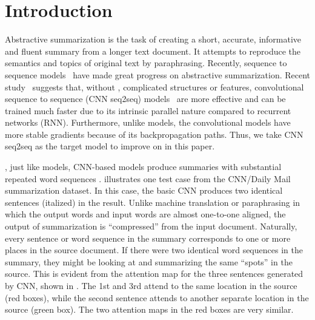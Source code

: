 \section{Introduction}
\label{sec:intro}

Abstractive summarization is the task of creating a short, accurate,
informative and fluent summary from a longer text document.
It attempts to reproduce the semantics and topics of original text
by paraphrasing. 
Recently, sequence to sequence
models~\cite{RushCW15,ChopraAR16,NallapatiZSGX16,SeeLM17,PaulusXS17}
have made great progress on abstractive summarization.
Recent study~\cite{bai2018empirical} suggests that, 
without \DIFdelbegin {}\DIFdelend \DIFaddbegin {}\DIFaddend , complicated structures or features,
convolutional sequence to sequence 
(CNN seq2seq) models~\cite{gehring2017convs2s,FanGA18,LiuLZ18} 
are more effective and can be trained much faster due to 
its intrinsic parallel nature compared to recurrent networks (RNN).
Furthermore, unlike \DIFdelbegin {}\DIFdelend \DIFaddbegin {}\DIFaddend models, 
the convolutional models have more stable gradients 
because of its backpropagation paths. 
Thus, we take CNN seq2seq \DIFdelbegin {}\DIFdelend \DIFaddbegin {}\DIFaddend as the target model to improve on \DIFaddbegin {}\DIFaddend in this paper.

\DIFdelbegin {}\DIFdelend \DIFaddbegin {}\DIFaddend , just like \DIFdelbegin {}\DIFdelend \DIFaddbegin {}\DIFaddend models, CNN-based models \DIFdelbegin {}\DIFdelend \DIFaddbegin {}\DIFaddend produce
summaries with substantial repeated word sequences \DIFaddbegin {}\DIFaddend .
 illustrates one 
test case from the CNN/Daily Mail summarization dataset. 
In this case, the basic CNN produces two 
identical sentences (italized) in the result. 
Unlike machine translation or paraphrasing in which the output words
and input words are almost one-to-one aligned, the output of summarization
is ``compressed'' from the input document. Naturally, every sentence or 
word sequence in the summary corresponds to one or more places in the source
document. If there were two identical word sequences in the summary,
they might be looking at and summarizing the same ``spots'' in the source.
This is evident from the attention map for the three sentences generated by 
CNN, shown in . The 1st and 3rd \DIFdelbegin {}\DIFdelend \DIFaddbegin {}\DIFaddend attend to
the same location in the source (red boxes), while the second
sentence attends to another separate location in the source (green box). 
The two attention maps in the red boxes are very similar.

